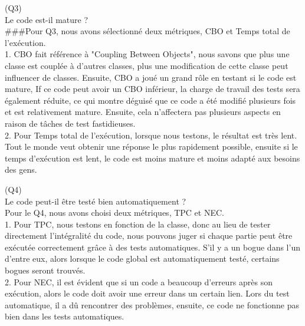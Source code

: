 \documentclass{article}
\begin{document}
\item(Q3)\\

Le code est-il mature ?\\

###Pour Q3, nous avons sélectionné deux métriques, CBO et Temps total de l’exécution.\\

1. CBO fait référence à "Coupling Between Objects", nous savons que plus une classe est couplée à d'autres classes, plus une modification de cette classe peut influencer de classes. Ensuite, CBO a joué un grand rôle en testant si le code est mature, If ce code peut avoir un CBO inférieur, la charge de travail des tests sera également réduite, ce qui montre déguisé que ce code a été modifié plusieurs fois et est relativement mature. Ensuite, cela n'affectera pas plusieurs aspects en raison de tâches de test fastidieuses.\\

2. Pour Temps total de l’exécution, lorsque nous testons, le résultat est très lent. Tout le monde veut obtenir une réponse le plus rapidement possible, ensuite si le temps d'exécution est lent, le code est moins mature et moins adapté aux besoins des gens.\\


\item(Q4)\\

 Le code peut-il être testé bien automatiquement ?\\
 
 Pour le Q4, nous avons choisi deux métriques, TPC et NEC.\\

1. Pour TPC, nous testons en fonction de la classe, donc au lieu de tester directement l'intégralité du code, nous pouvons juger si chaque partie peut être exécutée correctement grâce à des tests automatiques. S'il y a un bogue dans l'un d'entre eux, alors lorsque le code global est automatiquement testé, certains bogues seront trouvés.\\

2. Pour NEC, il est évident que si un code a beaucoup d'erreurs après son exécution, alors le code doit avoir une erreur dans un certain lien. Lors du test automatique, il a dû rencontrer des problèmes, ensuite, ce code ne fonctionne pas bien dans les tests automatiques.\\
\end{document}
